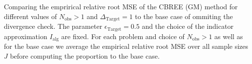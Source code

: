 Comparing the emprirical relative root MSE of the CBREE (GM) method for different values of $N_{ \text{obs} } > 1$  and $\Delta_{\text{Target}}=1$ to the base case of ommiting the divergence check. The parameter $\epsilon_{\text{Target}} = 0.5$ and the choice of the indicator approximation $I_\text{alg}$ are fixed. For each problem and choice of $N_{ \text{obs} } > 1$ as well as for the base case we average the empirical relative root MSE over all sample sizes $J$ before computing the proportion to the base case.